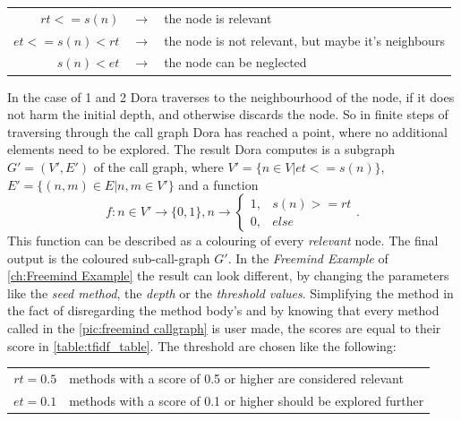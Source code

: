 \vspace{2em} %
\begin{table}[h]
	\centering
	\begin{tabular}{r c l}
		$rt <= s(n)$ & $\rightarrow$ & the node is relevant\\
		$et <= s(n) < rt$ & $\rightarrow$ & the node is not relevant, but maybe it's neighbours \\
		$s(n) < et$ & $\rightarrow$ & the node can be neglected
	\end{tabular}
\end{table}

In the case of 1 and 2 Dora traverses to the neighbourhood of the node, if it does not harm the initial depth, and otherwise discards the node. So in finite steps of traversing through the call graph Dora has reached a point, where no additional elements need to be explored.\newline
The result Dora computes is a subgraph $G'=(V',E')$ of the call graph, where $V' = \{ n \in V | et <= s(n) \}$, $E' = \{ (n,m) \in E | n,m \in V' \}$ and a function \newline
\[
	f: n\in V' \rightarrow \{0,1\},n \rightarrow 
		\left\{
			\begin{array}{ll} 
				1, & s(n) >= rt \\
				0, & else 
			\end{array}\right. .
\]
This function can be described as a colouring of every \textit{relevant} node. The final output is the coloured sub-call-graph $G'$. \newline
\emptyLine
In the \textit{Freemind Example} of \autoref{ch:Freemind Example} the result can look different, by changing the parameters like the \textit{seed method}, the \textit{depth} or the \textit{threshold values}.
Simplifying the method in the fact of disregarding the method body's and by knowing that every method called in the \autoref{pic:freemind callgraph} is user made, the scores are equal to their score in \autoref{table:tfidf_table}. \newline
The threshold are chosen like the following:
\begin{table}[h]
	\centering
	\begin{tabular}{r l}
		$rt = 0.5$ & methods with a score of 0.5 or higher are considered relevant \\
		$et = 0.1$ & methods with a score of 0.1 or higher should be explored further
	\end{tabular}
\end{table}
